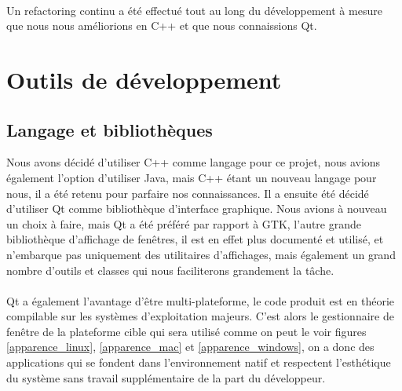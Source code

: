 \paragraph{}
Un refactoring continu a été effectué tout au long du développement à mesure que nous nous améliorions en C++ et que nous connaissions Qt.

\section{Outils de développement}

\subsection{Langage et bibliothèques}

Nous avons décidé d'utiliser C++ comme langage pour ce projet, nous avions également l'option d'utiliser Java, mais C++ étant un nouveau langage pour nous, il a été retenu pour parfaire nos connaissances. Il a ensuite été décidé d'utiliser Qt comme bibliothèque d'interface graphique. Nous avions à nouveau un choix à faire, mais Qt a été préféré par rapport à GTK, l'autre grande bibliothèque d'affichage de fenêtres, il est en effet plus documenté et utilisé, et n'embarque pas uniquement des utilitaires d'affichages, mais également un grand nombre d'outils et classes qui nous faciliterons grandement la tâche.
\paragraph{}
Qt a également l'avantage d'être multi-plateforme, le code produit est en théorie compilable sur les systèmes d'exploitation majeurs. C'est alors le gestionnaire de fenêtre de la plateforme cible qui sera utilisé comme on peut le voir figures \ref{apparence_linux}, \ref{apparence_mac} et \ref{apparence_windows}, on a donc des applications qui se fondent dans l'environnement natif et respectent l'esthétique du système sans travail supplémentaire de la part du développeur.

